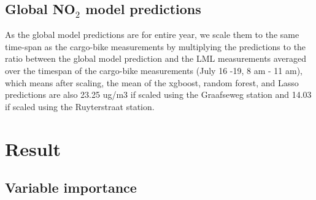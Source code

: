 \documentclass{article}
\begin{document}
  \subsection{Global NO$_2$ model predictions}
As the global model predictions are for entire year, we scale them to the same time-span as the cargo-bike measurements by multiplying the predictions to the ratio between the global model prediction and the LML measurements averaged over the timespan of the cargo-bike measurements (July 16 -19, 8 am - 11 am), which means after scaling, the mean of the xgboost, random forest, and Lasso predictions are also 23.25 ug/m3 if scaled using the Graafseweg station and 14.03 if scaled using the Ruyterstraat station.   

\section{Result}
\subsection{Variable importance}
\end{document}
